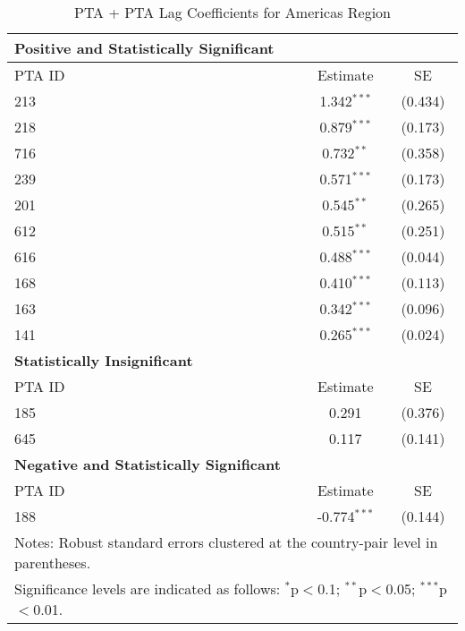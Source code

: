 \begin{table}[htbp]
    \centering
    \caption{PTA + PTA Lag Coefficients for Americas Region}
    \label{tab:pta_americas}
    \begin{adjustbox}{max width=\textwidth}
    \begin{tabular}{lcc}
    \hline
    \textbf{Positive and Statistically Significant} &  &  \\
    \hline
    PTA ID & Estimate & SE \\
    \hline
    213 & 1.342$^{\ast\ast\ast}$ & (0.434) \\
    218 & 0.879$^{\ast\ast\ast}$ & (0.173) \\
    716 & 0.732$^{\ast\ast}$ & (0.358) \\
    239 & 0.571$^{\ast\ast\ast}$ & (0.173) \\
    201 & 0.545$^{\ast\ast}$ & (0.265) \\
    612 & 0.515$^{\ast\ast}$ & (0.251) \\
    616 & 0.488$^{\ast\ast\ast}$ & (0.044) \\
    168 & 0.410$^{\ast\ast\ast}$ & (0.113) \\
    163 & 0.342$^{\ast\ast\ast}$ & (0.096) \\
    141 & 0.265$^{\ast\ast\ast}$ & (0.024) \\
    \hline
    \textbf{Statistically Insignificant} &  &  \\
    \hline
    PTA ID & Estimate & SE \\
    \hline
    185 & 0.291 & (0.376) \\
    645 & 0.117 & (0.141) \\
    \hline
    \textbf{Negative and Statistically Significant} &  &  \\
    \hline
    PTA ID & Estimate & SE \\
    \hline
    188 & -0.774$^{\ast\ast\ast}$ & (0.144) \\
    \hline
    \multicolumn{3}{l}{\footnotesize{Notes: Robust standard errors clustered at the country-pair level in parentheses.}} \\
    \multicolumn{3}{l}{\footnotesize{Significance levels are indicated as follows: $^{\ast}$p$<$0.1; $^{\ast\ast}$p$<$0.05; $^{\ast\ast\ast}$p$<$0.01.}} \\
    \end{tabular}
    \end{adjustbox}
\end{table}
